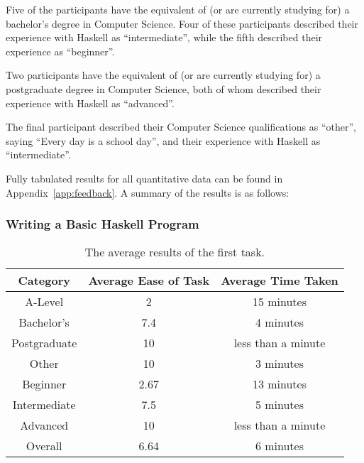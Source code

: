 \documentclass[../main.tex]{subfiles}
\begin{document}
                Five of the participants have the equivalent of (or are currently studying for)
                    a bachelor's degree in Computer Science.
                Four of these participants described their experience with Haskell as
                    ``intermediate'', while the fifth described their experience as ``beginner''.

                Two participants have the equivalent of (or are currently studying for) a
                    postgraduate degree in Computer Science, both of whom described their
                    experience with Haskell as ``advanced''.

                The final participant described their Computer Science qualifications as
                    ``other'', saying ``Every day is a school day'', and their experience with
                    Haskell as ``intermediate''.

                Fully tabulated results for all quantitative data can be found in
                    Appendix~\ref{app:feedback}.
                A summary of the results is as follows:

            \subsubsection{Writing a Basic Haskell Program}
                \begin{table}[H]
                    \centering
                    \begin{tabular}{c|c|c}
                        \textbf{Category} & \textbf{Average Ease of Task} & \textbf{Average Time Taken} \\
                        \hline
                        A-Level           & 2                             & 15 minutes                  \\
                        Bachelor's        & 7.4                           & 4 minutes                   \\
                        Postgraduate      & 10                            & less than a minute          \\
                        Other             & 10                            & 3 minutes                   \\
                        \hline
                        Beginner          & 2.67                          & 13 minutes                  \\
                        Intermediate      & 7.5                           & 5 minutes                   \\
                        Advanced          & 10                            & less than a minute          \\
                        \hline
                        Overall           & 6.64                          & 6 minutes                   \\
                    \end{tabular}
                    \caption{The average results of the first task.}
                \end{table}
\end{document}
